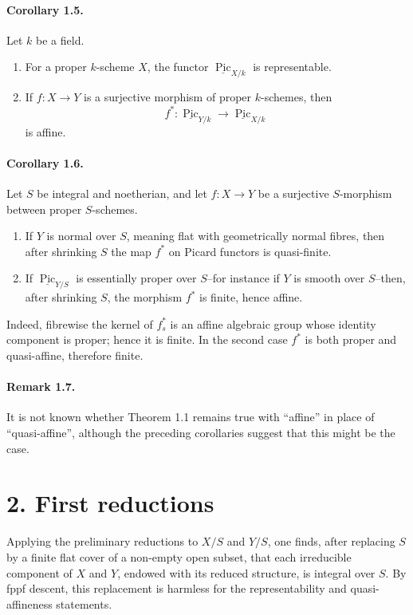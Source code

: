 \documentclass[11pt]{article}
\theoremstyle{plain}
\theoremstyle{definition}
\theoremstyle{remark}
\DeclareMathOperator{\Pic}{Pic}
\newcommand{\longto}{\longrightarrow}
\begin{document}
\paragraph{Corollary 1.5.}
Let $k$ be a field.
\begin{enumerate}[label=\alph*)]
\item For a proper $k$-scheme $X$, the functor $\underline{\Pic}_{X/k}$ is representable.
\item If $f:X\to Y$ is a surjective morphism of proper $k$-schemes, then
\[
f^*:\underline{\Pic}_{Y/k}\longto\underline{\Pic}_{X/k}
\]
is affine.
\end{enumerate}

\paragraph{Corollary 1.6.}
Let $S$ be integral and noetherian, and let $f:X\to Y$ be a surjective $S$-morphism between proper $S$-schemes.
\begin{enumerate}[label=\alph*)]
\item If $Y$ is normal over $S$, meaning flat with geometrically normal fibres, then after shrinking $S$ the map $f^*$ on Picard functors is quasi-finite.
\item If $\underline{\Pic}_{Y/S}$ is essentially proper over $S$--for instance if $Y$ is smooth over $S$--then, after shrinking $S$, the morphism $f^*$ is finite, hence affine.
\end{enumerate}
Indeed, fibrewise the kernel of $f_s^*$ is an affine algebraic group whose identity component is proper; hence it is finite. In the second case $f^*$ is both proper and quasi-affine, therefore finite.

\paragraph{Remark 1.7.}
It is not known whether Theorem 1.1 remains true with ``affine'' in place of ``quasi-affine'', although the preceding corollaries suggest that this might be the case.

\section*{2. First reductions}

Applying the preliminary reductions to $X/S$ and $Y/S$, one finds, after replacing $S$ by a finite flat cover of a non-empty open subset, that each irreducible component of $X$ and $Y$, endowed with its reduced structure, is integral over $S$. By fppf descent, this replacement is harmless for the representability and quasi-affineness statements.
\end{document}
